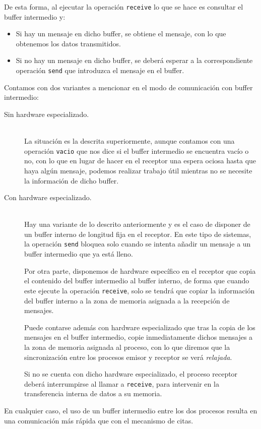 De esta forma, al ejecutar la operación \verb|receive| lo que se hace es consultar el buffer intermedio y:
\begin{itemize}
    \item Si hay un mensaje en dicho buffer, se obtiene el mensaje, con lo que obtenemos los datos transmitidos.
    \item Si no hay un mensaje en dicho buffer, se deberá esperar a la correspondiente operación \verb|send| que introduzca el mensaje en el buffer.
\end{itemize}
Contamos con dos variantes a mencionar en el modo de comunicación con buffer intermedio:
\begin{description}
    \item [Sin hardware especializado.]~\\
        La situación es la descrita superiormente, aunque contamos con una operación \verb|vacio| que nos dice si el buffer intermedio se encuentra vacío o no, con lo que en lugar de hacer en el receptor una espera ociosa hasta que haya algún mensaje, podemos realizar trabajo útil mientras no se necesite la información de dicho buffer.
    \item [Con hardware especializado.]~\\
        Hay una variante de lo descrito anteriormente y es el caso de disponer de un buffer interno de longitud fija en el receptor. En este tipo de sistemas, la operación \verb|send| bloquea solo cuando se intenta añadir un mensaje a un buffer intermedio que ya está lleno. 

        Por otra parte, disponemos de hardware específico en el receptor que copia el contenido del buffer intermedio al buffer interno, de forma que cuando este ejecute la operación \verb|receive|, solo se tendrá que copiar la información del buffer interno a la zona de memoria asignada a la recepción de mensajes.

        Puede contarse además con hardware especializado que tras la copia de los mensajes en el buffer intermedio, copie inmediatamente dichos mensajes a la zona de memoria asignada al proceso, con lo que diremos que la sincronización entre los procesos emisor y receptor se verá \textit{relajada}.

        Si no se cuenta con dicho hardware especializado, el proceso receptor deberá interrumpirse al llamar a \verb|receive|, para intervenir en la transferencia interna de datos a su memoria.
\end{description}
En cualquier caso, el uso de un buffer intermedio entre los dos procesos resulta en una comunicación más rápida que con el mecanismo de citas.

